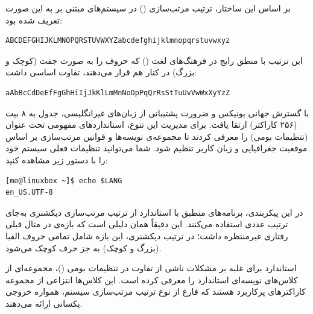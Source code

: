 بر اساس این ساختار، ترتیب مرتب‌سازی () در سیستم‌های مبتنی بر  به این صورت تعریف شده بود:

\begin{latin}
\begin{lstlisting}
ABCDEFGHIJKLMNOPQRSTUVWXYZabcdefghijklmnopqrstuvwxyz
\end{lstlisting}
\end{latin}

این ترتیب با منطق رایج در فرهنگ‌های لغت () که حروف را به صورت جفت (کوچک و بزرگ) در کنار هم قرار می‌دهند، تفاوت اساسی داشت:

\begin{latin}
\begin{lstlisting}
aAbBcCdDeEfFgGhHiIjJkKlLmMnNoOpPqQrRsStTuUvVwWxXyYzZ
\end{lstlisting}
\end{latin}

با گسترش جهانی یونیکس و ضرورت پشتیبانی از زبان‌های غیرانگلیسی، جدول  به ۸ بیت (۲۵۶ کاراکتر) ارتقا یافت. برای مدیریت این تنوع، استانداردهای  مفهومی تحت عنوان  (تنظیمات بومی) را معرفی کردند تا مجموعه‌ی نویسه‌ها و قوانین مرتب‌سازی بر اساس موقعیت جغرافیایی و زبان کاربر تنظیم شود. شما می‌توانید تنظیمات فعلی سیستم خود را با دستور زیر مشاهده کنید:

\begin{latin}
\begin{lstlisting}
[me@linuxbox ~]$ echo $LANG
en_US.UTF-8
\end{lstlisting}
\end{latin}

در این پیکربندی، برنامه‌های منطبق با استاندارد  از ترتیب مرتب‌سازی دیکشنری به‌جای ترتیب عددی  استفاده می‌کنند. این دقیقاً همان دلیلی است که بازه‌ی \cmd{[A-Z]} در مثال قبلی رفتاری غیرمنتظره داشت؛ در ترتیب دیکشنری، این بازه شامل تمامی حروف الفبا (بزرگ و کوچک) به جز حرف کوچک  می‌شود.

استاندارد  برای غلبه بر مشکلات ناشی از تفاوت در تنظیمات بومی ()، مجموعه‌ای از کلاس‌های نویسه‌ای استاندارد را معرفی کرده است. این کلاس‌ها انتزاعی از مجموعه کاراکترهای پرکاربرد هستند که فارغ از نوع ترتیب مرتب‌سازی سیستم، همواره خروجی یکسانی ارائه می‌دهند.

